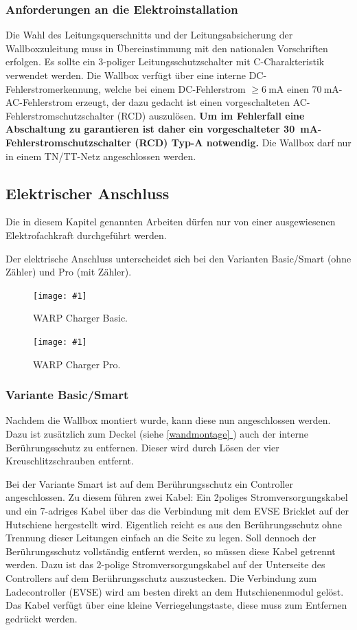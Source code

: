 \documentclass[a4paper,10pt]{article}
\newcommand{\hint}[1]{\begin{tcolorbox}[colback=boxgray,colframe=black,coltext=
white,title=Hinweis]#1\end{tcolorbox}}
\newcommand{\gfx}[1]{\texttt{[image: \#1]}}
\newcommand*{\fullref}[1]{\hyperref[{#1}]{\ref*{#1} \nameref*{#1}}}
\begin{document}
\begin{multicols*}{2}
	\subsubsection{Anforderungen an die Elektroinstallation}
	Die Wahl des Leitungsquerschnitts und der Leitungsabsicherung der
	Wallboxzuleitung muss in Übereinstimmung mit den nationalen Vorschriften
	erfolgen. Es sollte ein 3-poliger Leitungsschutzschalter mit C-Charakteristik
	verwendet werden.
	Die Wallbox verfügt über eine interne DC-Fehlerstromerkennung, welche
	bei einem DC-Fehlerstrom $\geq \SI{6}{\milli\ampere}$ einen
	$\SI{70}{\milli\ampere}$-AC-Fehlerstrom erzeugt, der dazu gedacht ist einen
	vorgeschalteten AC-Fehlerstromschutzschalter (RCD) auszulösen.
	\textbf{Um im Fehlerfall eine Abschaltung zu garantieren ist daher ein vorgeschalteter
		\SI{30}{\milli\ampere}-Fehlerstromschutzschalter (RCD) Typ-A notwendig.} Die Wallbox darf nur in einem TN/TT-Netz angeschlossen
	werden.

	\newpage
	\subsection{Elektrischer Anschluss}
	\hint{Die in diesem Kapitel genannten Arbeiten dürfen nur von einer ausgewiesenen
		Elektrofachkraft durchgeführt werden.}
	Der elektrische Anschluss unterscheidet sich bei den Varianten Basic/Smart
	(ohne Zähler) und Pro (mit Zähler).

	\begin{figure}[H]
		\gfx{./img/resized/warp_basic_inlay_ready}
		\caption*{WARP Charger Basic.}
	\end{figure}

	\begin{figure}[H]
		\gfx{./img/resized/warp_pro_inlay_ready}
		\caption*{WARP Charger Pro.}
	\end{figure}

	\subsubsection{Variante Basic/Smart}
	Nachdem die Wallbox montiert wurde, kann diese nun angeschlossen werden. Dazu
	ist zusätzlich zum Deckel (siehe \fullref{wandmontage}) auch der interne
	Berührungsschutz zu entfernen. Dieser wird durch Lösen der vier
	Kreuschlitzschrauben entfernt.

	Bei der Variante Smart ist auf dem Berührungsschutz ein Controller
	angeschlossen. Zu diesem führen zwei Kabel: Ein 2poliges
	Stromversorgungskabel und ein 7-adriges Kabel über das die Verbindung mit dem
	EVSE Bricklet auf der Hutschiene hergestellt wird. Eigentlich reicht es aus
	den Berührungsschutz ohne Trennung dieser Leitungen einfach an die Seite zu
	legen. Soll dennoch der Berührungsschutz vollständig entfernt werden, so 
	müssen diese Kabel getrennt werden. Dazu ist das 2-polige 
	Stromversorgungskabel auf der Unterseite des Controllers auf dem 
	Berührungsschutz auszustecken. Die Verbindung zum Ladecontroller (EVSE) wird 
	am besten direkt an dem Hutschienenmodul gelöst. Das Kabel verfügt über 
	eine kleine Verriegelungstaste, diese muss zum Entfernen gedrückt werden.


\end{multicols*}
\end{document}
